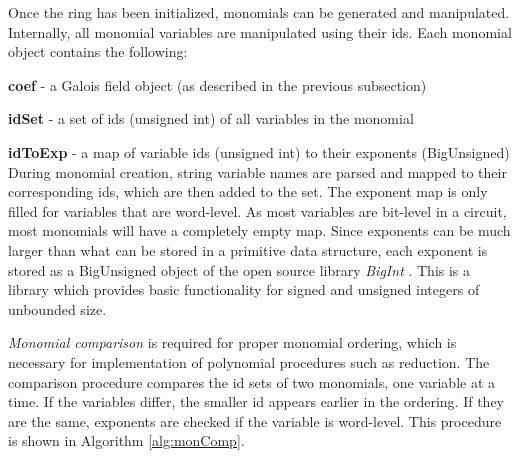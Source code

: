 Once the ring has been initialized, monomials can be generated and manipulated.
Internally, all monomial variables are manipulated using their ids. 
Each monomial object contains the following:
\bi
\item {\bf coef} - a Galois field object (as described in the previous subsection)
\item {\bf idSet} - a set of ids (unsigned int) of all variables in the monomial
\item {\bf idToExp} - a map of variable ids (unsigned int) to their exponents (BigUnsigned)
\ei
During monomial creation, string variable names are parsed and mapped to their 
corresponding ids, which are then added to the set.
The exponent map is only filled for variables that are word-level. As most 
variables are bit-level in a circuit, most monomials will have a completely empty
map. Since exponents can be much larger than what can be stored in a primitive 
data structure, each exponent is stored as a BigUnsigned object of the open 
source library {\it BigInt} \cite{BigInt}. This is a library which provides
basic functionality for signed and unsigned integers of unbounded size.

{\it Monomial comparison} is required for proper monomial ordering, which is
necessary for implementation of polynomial procedures such as reduction.
The comparison procedure compares the id sets of two monomials, one variable at 
a time. If the variables differ, the smaller id appears earlier in the ordering.
If they are the same, exponents are checked if the variable is word-level. 
This procedure is shown in Algorithm \ref{alg:monComp}.

